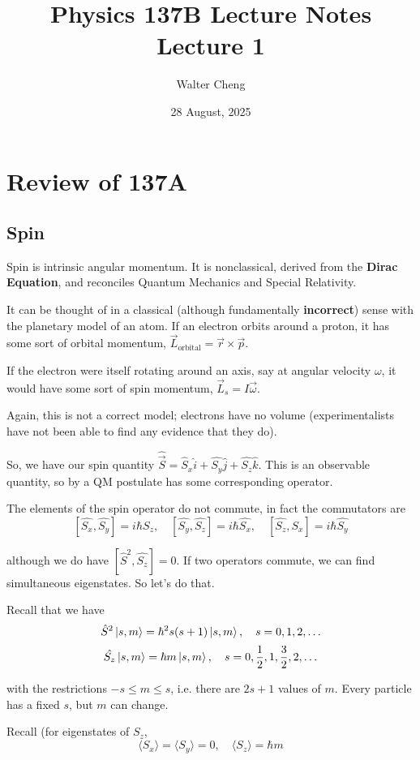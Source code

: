 \documentclass[11pt]{article}
\title{Physics 137B Lecture Notes\\ Lecture 1}
\date{28 August, 2025}
\author{Walter Cheng}
\begin{document}
\maketitle

\section{Review of 137A}

\subsection*{Spin}

Spin is intrinsic angular momentum. It is nonclassical, derived from the \textbf{Dirac Equation}, and reconciles Quantum Mechanics and Special Relativity.

It can be thought of in a classical (although fundamentally \textbf{incorrect}) sense with the planetary model of an atom. If an electron orbits around a proton, it has some sort of orbital momentum, $\vec{L}_{\text{orbital}} = \vec{r} \times \vec{p}$.

If the electron were itself rotating around an axis, say at angular velocity $\omega$, it would have some sort of spin momentum, $\vec{L}_s = I\vec{\omega}$.

Again, this is not a correct model; electrons have no volume (experimentalists have not been able to find any evidence that they do).

So, we have our spin quantity $\hat{\vec{S}} = \hat{S}_x \hat{i} + \hat{S_y}\hat{j} + \hat{S_z}\hat{k}$. This is an observable quantity, so by a QM postulate has some corresponding operator.

The elements of the spin operator do not commute, in fact the commutators are
\[[\hat{S_x}, \hat{S_y}] = i\hbar \hat{S_z}, \quad [\hat{S_y}, \hat{S_z}] = i\hbar\hat{S_x}, \quad [\hat{S_z}, \hat{S_x}] = i\hbar\hat{S_y}\]

although we do have $[\hat{S}^2, \hat{S_z}] = 0$. If two operators commute, we can find simultaneous eigenstates. So let's do that.

Recall that we have
\[\hat{S}^2 \ket{s, m} = \hbar^2 s(s+1) \ket{s, m}, \quad s = 0, 1, 2,\ldots\]
\[\hat{S_z}\ket{s, m} = \hbar m\ket{s, m}, \quad s = 0, \frac{1}{2}, 1, \frac{3}{2}, 2, \ldots\]

with the restrictions $-s \leq m \leq s$, i.e. there are $2s+1$ values of $m$. Every particle has a fixed $s$, but $m$ can change.

Recall (for eigenstates of $S_z$,
\[\langle S_x\rangle = \langle S_y \rangle = 0, \quad \langle S_z\rangle = \hbar m\]
\end{document}
